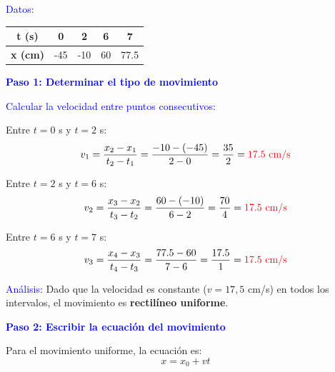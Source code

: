 \begin{exercise}
\begin{solu}
        \vspace{0.3cm}

        \textcolor{blue}{Datos:}
        \begin{center}
            \begin{tabular}{@{}ccccc@{}}
                \toprule
                \textbf{t (s)} & \textbf{0} & \textbf{2} & \textbf{6} & \textbf{7} \\
                \midrule
                \textbf{x (cm)} & -45 & -10 & 60 & 77.5 \\
                \bottomrule
            \end{tabular}
        \end{center}

        \textbf{\textcolor{blue}{Paso 1: Determinar el tipo de movimiento}}

        \textcolor{blue}{Calcular la velocidad entre puntos consecutivos:}

        Entre $t = 0$ s y $t = 2$ s:
        \[
            v_1 = \frac{x_2 - x_1}{t_2 - t_1} = \frac{-10 - (-45)}{2 - 0} = \frac{35}{2} = \textcolor{red}{17.5 \text{ cm/s}}
        \]

        Entre $t = 2$ s y $t = 6$ s:
        \[
            v_2 = \frac{x_3 - x_2}{t_3 - t_2} = \frac{60 - (-10)}{6 - 2} = \frac{70}{4} = \textcolor{red}{17.5 \text{ cm/s}}
        \]

        Entre $t = 6$ s y $t = 7$ s:
        \[
            v_3 = \frac{x_4 - x_3}{t_4 - t_3} = \frac{77.5 - 60}{7 - 6} = \frac{17.5}{1} = \textcolor{red}{17.5 \text{ cm/s}}
        \]

        \textcolor{blue}{Análisis:} Dado que la velocidad es constante ($v = 17,5$ cm/s) en todos los intervalos, el movimiento es \textbf{rectilíneo uniforme}.

        \vspace{0.3cm}

        \textbf{\textcolor{blue}{Paso 2: Escribir la ecuación del movimiento}}

        Para el movimiento uniforme, la ecuación es:
        \[
            \boxed{x = x_0 + vt}
        \]


\end{solu}
\end{exercise}

